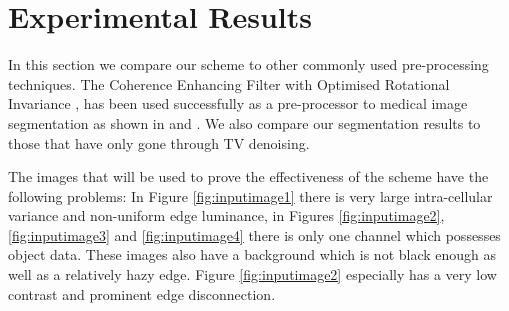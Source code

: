 \documentclass[a4paper,11pt]{ijamas}
\begin{document}
\section{Experimental Results}
\label{sec:results}
In this section we compare our scheme to other commonly used pre-processing techniques. The Coherence Enhancing Filter with Optimised Rotational Invariance \cite{jweickert:2002}, has been used successfully as a pre-processor to medical image segmentation as shown in \cite{mmaska:2013} and \cite{dkroon:2009}. We also compare our segmentation results to those that have only gone through TV denoising.

The images that will be used to prove the effectiveness of the scheme have the following problems: In Figure \ref{fig:inputimage1} there is very large intra-cellular variance and non-uniform edge luminance, in Figures \ref{fig:inputimage2}, \ref{fig:inputimage3} and  \ref{fig:inputimage4} there is only one channel which possesses object data. These images also have a background which is not black enough as well as a relatively hazy edge. Figure \ref{fig:inputimage2} especially has a very low contrast and prominent edge disconnection.
\end{document}
